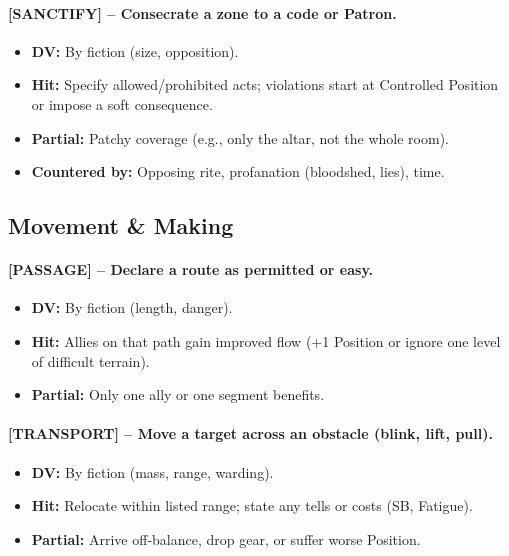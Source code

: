 \paragraph{[SANCTIFY] – Consecrate a zone to a code or Patron.}
\begin{itemize}
  \item \textbf{DV:} By fiction (size, opposition).
  \item \textbf{Hit:} Specify allowed/prohibited acts; violations start at Controlled Position or impose a soft consequence.
  \item \textbf{Partial:} Patchy coverage (e.g., only the altar, not the whole room).
  \item \textbf{Countered by:} Opposing rite, profanation (bloodshed, lies), time.
\end{itemize}

\subsection{Movement \& Making}

\paragraph{[PASSAGE] – Declare a route as permitted or easy.}
\begin{itemize}
  \item \textbf{DV:} By fiction (length, danger).
  \item \textbf{Hit:} Allies on that path gain improved flow (+1 Position or ignore one level of difficult terrain).
  \item \textbf{Partial:} Only one ally or one segment benefits.
\end{itemize}

\paragraph{[TRANSPORT] – Move a target across an obstacle (blink, lift, pull).}
\begin{itemize}
  \item \textbf{DV:} By fiction (mass, range, warding).
  \item \textbf{Hit:} Relocate within listed range; state any tells or costs (SB, Fatigue).
  \item \textbf{Partial:} Arrive off‑balance, drop gear, or suffer worse Position.
\end{itemize}


